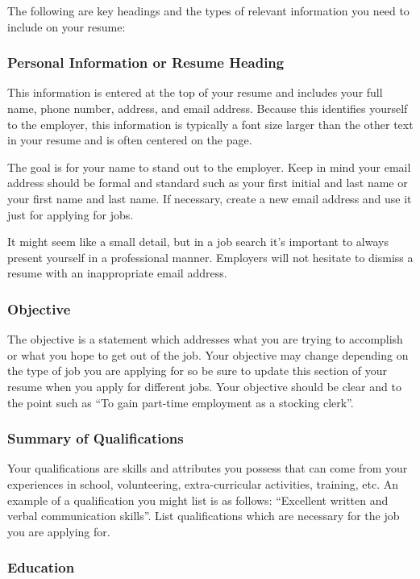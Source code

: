 The following are key headings and the types of relevant information you need to include on your resume:

\subsubsection*{Personal Information or Resume Heading}

This information is entered at the top of your resume and includes your full name, phone number, address, and email address. Because this identifies yourself to the employer, this information is typically a font size larger than the other text in your resume and is often centered on the page.

The goal is for your name to stand out to the employer. Keep in mind your email address should be formal and standard such as your first initial and last name or your first name and last name. If necessary, create a new email address and use it just for applying for jobs.

It might seem like a small detail, but in a job search it's important to always present yourself in a professional manner. Employers will not hesitate to dismiss a resume with an inappropriate email address.

\subsubsection*{Objective}

The objective is a statement which addresses what you are trying to accomplish or what you hope to get out of the job. Your objective may change depending on the type of job you are applying for so be sure to update this section of your resume when you apply for different jobs. Your objective should be clear and to the point such as ``To gain part-time employment as a stocking clerk''.

\subsubsection*{Summary of Qualifications}

Your qualifications are skills and attributes you possess that can come from your experiences in school, volunteering, extra-curricular activities, training, etc. An example of a qualification you might list is as follows: ``Excellent written and verbal communication skills''. List qualifications which are necessary for the job you are applying for.

\subsubsection*{Education}

